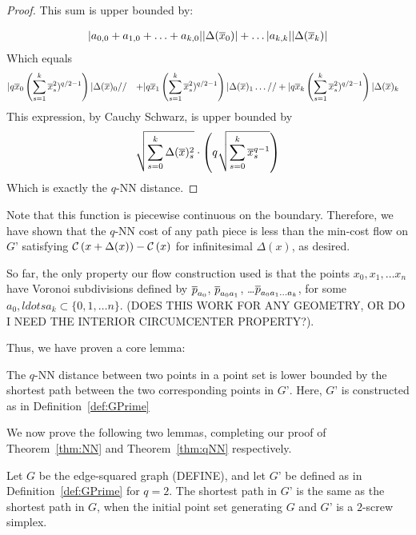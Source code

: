 \begin{proof}
This sum is upper bounded by:

\begin{align}
|a_{0, 0} + a_{1, 0} + \ldots + a_{k, 0}| |\Delta(\overline{x}_0)|
+ \ldots
|a_{k, k}| |\Delta(\overline{x}_k)|
\end{align}
Which equals
\begin{align}
&|q\overline{x}_0\left(\sum_{s=1}^k \overline{x}_s^2)^{q/2-1}\right)| \Delta(\overline{x})_0
//&+
|q\overline{x}_1\left(\sum_{s=1}^k \overline{x}_s^2)^{q/2-1}\right)| \Delta(\overline{x})_1
\ldots
//& +
|q\overline{x}_k\left(\sum_{s=1}^k \overline{x}_s^2)^{q/2-1}\right)| \Delta(\overline{x})_k
\end{align}
This expression, by Cauchy Schwarz, is upper bounded by
\[
\sqrt{\sum_{s=0}^k \Delta(\overline{x})_s^2} \cdot \left(q\sqrt{\sum_{s=0}^k
\overline{x}_s^{q-1}}\right)
\]
Which is exactly the $q$-NN distance.

\end{proof}

Note that this function is piecewise continuous on the boundary. Therefore,
we have shown that the $q$-NN cost of any path piece is less than the
min-cost flow on $G’$ satisfying
$\mathcal{C}\left(x+\Delta(x)\right)-\mathcal{C}\left(x\right)$ for infinitesimal
$\Delta(x)$, as desired.

So far, the only property our flow construction used is that the points
$x_0, x_1, \ldots x_n$ have Voronoi subdivisions defined by $\overline{p}_{a_0}$,
$\overline{p}_{a_0a_1}$, \ldots $\overline{p}_{a_0a_1\ldots a_k}$, for some $a_0, ldots a_k
\subset \{0, 1, \ldots n\}$. (DOES THIS WORK FOR ANY GEOMETRY, OR DO I NEED
THE INTERIOR CIRCUMCENTER PROPERTY?).

Thus, we have proven a core lemma:

\begin{lemma}\label{lem:qNN-GPrime}

The $q$-NN distance between two points in a point set is lower bounded by
the shortest path between the two corresponding points in $G’$. Here, $G’$
is constructed as in Definition~\ref{def:GPrime}

\end{lemma}

We now prove the following two lemmas, completing our proof of
Theorem~\ref{thm:NN} and Theorem~\ref{thm:qNN} respectively.

\begin{lemma}\label{lem:edge-squared-GPrime} Let $G$ be the edge-squared graph
(DEFINE), and let $G’$ be defined as in Definition~\ref{def:GPrime} for $q=2$.
The shortest path in $G’$ is the same as the shortest path in $G$, when the
initial point set generating $G$ and $G’$ is a $2$-screw simplex.

\end{lemma}

